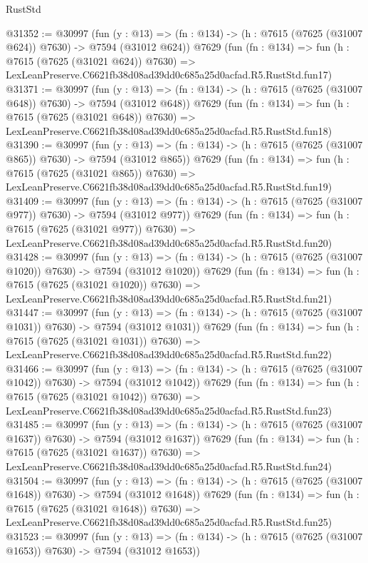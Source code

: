 \begin{lexlean}{RustStd}
\begin{coremodule}
@31352 := @30997
    (fun (y : @13) => (fn : @134) -> (h : @7615 (@7625 (@31007 @624)) @7630) -> @7594 (@31012 @624))
    @7629
    (fun (fn : @134) =>
    fun (h : @7615 (@7625 (@31021 @624)) @7630) =>
    LexLeanPreserve.C6621fb38d08ad39dd0c685a25d0acfad.R5.RustStd.fun17)
@31371 := @30997
    (fun (y : @13) => (fn : @134) -> (h : @7615 (@7625 (@31007 @648)) @7630) -> @7594 (@31012 @648))
    @7629
    (fun (fn : @134) =>
    fun (h : @7615 (@7625 (@31021 @648)) @7630) =>
    LexLeanPreserve.C6621fb38d08ad39dd0c685a25d0acfad.R5.RustStd.fun18)
@31390 := @30997
    (fun (y : @13) => (fn : @134) -> (h : @7615 (@7625 (@31007 @865)) @7630) -> @7594 (@31012 @865))
    @7629
    (fun (fn : @134) =>
    fun (h : @7615 (@7625 (@31021 @865)) @7630) =>
    LexLeanPreserve.C6621fb38d08ad39dd0c685a25d0acfad.R5.RustStd.fun19)
@31409 := @30997
    (fun (y : @13) => (fn : @134) -> (h : @7615 (@7625 (@31007 @977)) @7630) -> @7594 (@31012 @977))
    @7629
    (fun (fn : @134) =>
    fun (h : @7615 (@7625 (@31021 @977)) @7630) =>
    LexLeanPreserve.C6621fb38d08ad39dd0c685a25d0acfad.R5.RustStd.fun20)
@31428 := @30997
    (fun (y : @13) =>
    (fn : @134) -> (h : @7615 (@7625 (@31007 @1020)) @7630) -> @7594 (@31012 @1020))
    @7629
    (fun (fn : @134) =>
    fun (h : @7615 (@7625 (@31021 @1020)) @7630) =>
    LexLeanPreserve.C6621fb38d08ad39dd0c685a25d0acfad.R5.RustStd.fun21)
@31447 := @30997
    (fun (y : @13) =>
    (fn : @134) -> (h : @7615 (@7625 (@31007 @1031)) @7630) -> @7594 (@31012 @1031))
    @7629
    (fun (fn : @134) =>
    fun (h : @7615 (@7625 (@31021 @1031)) @7630) =>
    LexLeanPreserve.C6621fb38d08ad39dd0c685a25d0acfad.R5.RustStd.fun22)
@31466 := @30997
    (fun (y : @13) =>
    (fn : @134) -> (h : @7615 (@7625 (@31007 @1042)) @7630) -> @7594 (@31012 @1042))
    @7629
    (fun (fn : @134) =>
    fun (h : @7615 (@7625 (@31021 @1042)) @7630) =>
    LexLeanPreserve.C6621fb38d08ad39dd0c685a25d0acfad.R5.RustStd.fun23)
@31485 := @30997
    (fun (y : @13) =>
    (fn : @134) -> (h : @7615 (@7625 (@31007 @1637)) @7630) -> @7594 (@31012 @1637))
    @7629
    (fun (fn : @134) =>
    fun (h : @7615 (@7625 (@31021 @1637)) @7630) =>
    LexLeanPreserve.C6621fb38d08ad39dd0c685a25d0acfad.R5.RustStd.fun24)
@31504 := @30997
    (fun (y : @13) =>
    (fn : @134) -> (h : @7615 (@7625 (@31007 @1648)) @7630) -> @7594 (@31012 @1648))
    @7629
    (fun (fn : @134) =>
    fun (h : @7615 (@7625 (@31021 @1648)) @7630) =>
    LexLeanPreserve.C6621fb38d08ad39dd0c685a25d0acfad.R5.RustStd.fun25)
@31523 := @30997
    (fun (y : @13) =>
    (fn : @134) -> (h : @7615 (@7625 (@31007 @1653)) @7630) -> @7594 (@31012 @1653))

\end{coremodule}
\end{lexlean}
